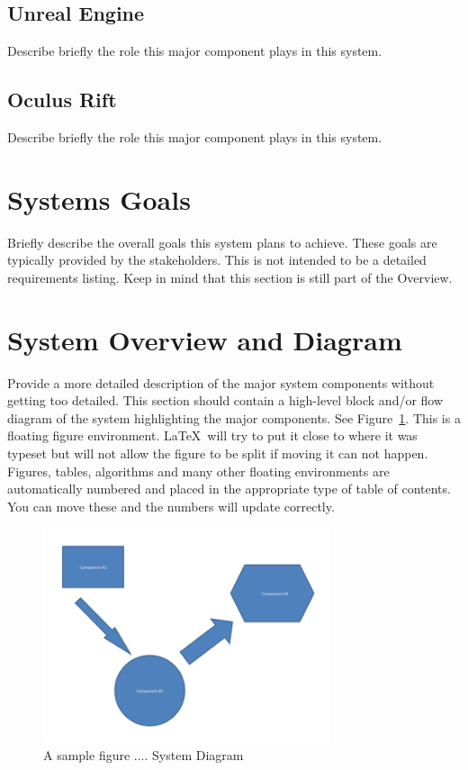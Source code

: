 \subsection{Unreal Engine}
Describe briefly the role this major component plays in this system. 

\subsection{Oculus Rift}
Describe briefly the role this major component plays in this system. 

\section{Systems Goals}
Briefly describe the overall goals this system plans to achieve.
These goals are typically provided by the stakeholders.  This is not
intended to be a detailed requirements listing.  Keep in mind that
this section is still part of the Overview.

\section{System Overview and Diagram}
Provide a more detailed description of the major system components
without getting too detailed.  This section should contain a
high-level block and/or flow diagram of the system highlighting the
major components.  See Figure~\ref{systemdiagram}.  This is a floating
figure environment.  \LaTeX\ will try to put it close to where it was
typeset but will not allow the figure to be split if moving it can not
happen.  Figures, tables, algorithms and many other floating
environments are automatically numbered and placed in the appropriate
type of table of contents.  You can move these and the numbers will
update correctly.

\begin{figure}[tbh]
\begin{center}
\includegraphics[width=0.75\textwidth]{./diagram}
\end{center}
\caption{A sample figure .... System Diagram \label{systemdiagram}}
\end{figure}

